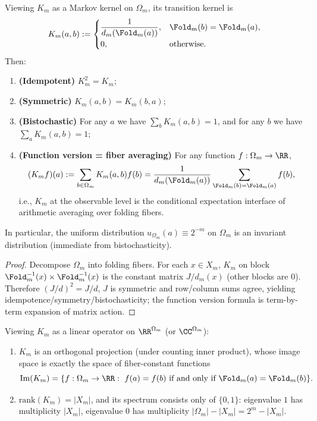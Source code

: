 \begin{proposition}\label{prop:pom-Km-bistochastic}
Viewing $K_m$ as a Markov kernel on $\Omega_m$, its transition kernel is
\[
K_m(a,b):=
\begin{cases}
\dfrac{1}{d_m(\Fold_m(a))},& \Fold_m(b)=\Fold_m(a),\\[6pt]
0,& \text{otherwise}.
\end{cases}
\]
Then:
\begin{enumerate}
  \item \textbf{(Idempotent)} $K_m^2=K_m$;
  \item \textbf{(Symmetric)} $K_m(a,b)=K_m(b,a)$;
  \item \textbf{(Bistochastic)} For any $a$ we have $\sum_b K_m(a,b)=1$, and for any $b$ we have $\sum_a K_m(a,b)=1$;
  \item \textbf{(Function version = fiber averaging)} For any function $f:\Omega_m\to\RR$,
  \[
  (K_m f)(a):=\sum_{b\in\Omega_m}K_m(a,b)f(b)
  =\frac{1}{d_m(\Fold_m(a))}\sum_{\Fold_m(b)=\Fold_m(a)} f(b),
  \]
  i.e., $K_m$ at the observable level is the conditional expectation interface of arithmetic averaging over folding fibers.
\end{enumerate}
In particular, the uniform distribution $u_{\Omega_m}(a)\equiv 2^{-m}$ on $\Omega_m$ is an invariant distribution (immediate from bistochasticity).
\end{proposition}
\begin{proof}
Decompose $\Omega_m$ into folding fibers. For each $x\in X_m$, $K_m$ on block $\Fold_m^{-1}(x)\times\Fold_m^{-1}(x)$ is the constant matrix $J/d_m(x)$ (other blocks are $0$). Therefore $(J/d)^2=J/d$, $J$ is symmetric and row/column sums agree, yielding idempotence/symmetry/bistochasticity; the function version formula is term-by-term expansion of matrix action.
\end{proof}

\begin{corollary}\label{cor:pom-Km-spectrum}
Viewing $K_m$ as a linear operator on $\RR^{\Omega_m}$ (or $\CC^{\Omega_m}$):
\begin{enumerate}
  \item $K_m$ is an orthogonal projection (under counting inner product), whose image space is exactly the space of fiber-constant functions
  \[
  \mathrm{Im}(K_m)=\{f:\Omega_m\to\RR:\ f(a)=f(b)\ \text{if and only if}\ \Fold_m(a)=\Fold_m(b)\}.
  \]
  \item $\mathrm{rank}(K_m)=|X_m|$, and its spectrum consists only of $\{0,1\}$: eigenvalue $1$ has multiplicity $|X_m|$, eigenvalue $0$ has multiplicity $|\Omega_m|-|X_m|=2^m-|X_m|$.
\end{enumerate}
\end{corollary}

